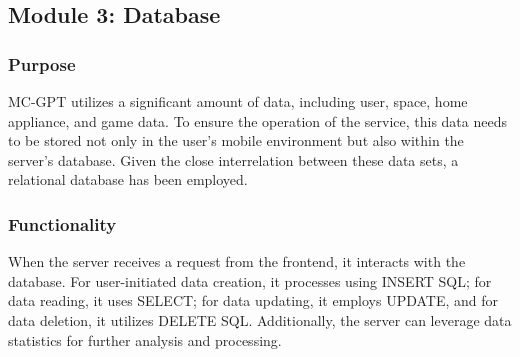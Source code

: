 \documentclass[conference]{IEEEtran}
\begin{document}
    \subsection{Module 3: Database}
        \subsubsection{Purpose}
            MC-GPT utilizes a significant amount of data, including user, space, home appliance, and game data. To ensure the operation of the service, this data needs to be stored not only in the user's mobile environment but also within the server's database. Given the close interrelation between these data sets, a relational database has been employed.\\
            \vspace{3mm}
        \subsubsection{Functionality}
            When the server receives a request from the frontend, it interacts with the database. For user-initiated data creation, it processes using INSERT SQL; for data reading, it uses SELECT; for data updating, it employs UPDATE, and for data deletion, it utilizes DELETE SQL. Additionally, the server can leverage data statistics for further analysis and processing.\\
            \vspace{3mm}
\end{document}
